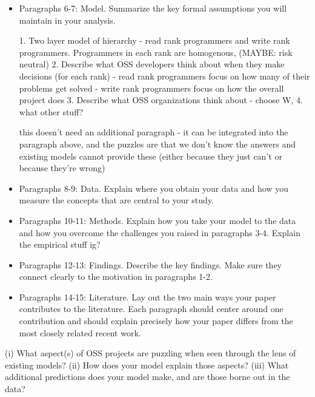 \documentclass[12pt,notitlepage]{article}
\begin{document}
\begin{itemize}
\item Paragraphs 6-7: Model. Summarize the key formal assumptions you will maintain in your analysis.

1. Two layer model of hierarchy - read rank programmers and write rank programmers. Programmers in each rank are homogenous, (MAYBE: risk neutral)
2. Describe what OSS developers think about when they make decisions (for each rank)
- read rank programmers focus on how many of their problems get solved
- write rank programmers focus on how the overall project does
3. Describe what OSS organizations think about
- choose W, 
4. what other stuff? 

this doesn't need an additional paragraph - it can be integrated into the paragraph above, and the puzzles are that we don't know the answers and existing models cannot provide these (either because they just can't or because they're wrong) 


\item Paragraphs 8-9: Data. Explain where you obtain your data and how you measure the concepts that are central to your study.
\item Paragraphs 10-11: Methods. Explain how you take your model to the data and how you overcome the challenges you raised in paragraphs 3-4.
Explain the empirical stuff ig? 

\item Paragraphs 12-13: Findings. Describe the key findings. Make sure they connect clearly to the motivation in paragraphs 1-2.
\item Paragraphs 14-15: Literature. Lay out the two main ways your paper contributes to the literature. Each paragraph should center around one contribution and should explain precisely how your paper differs from the most closely related recent work.
\end{itemize}

(i) What aspect(s) of OSS projects are puzzling when seen through the lens of existing models?
(ii) How does your model explain those aspects? 
(iii) What additional predictions does your model make, and are those borne out in the data? 
\end{document}
